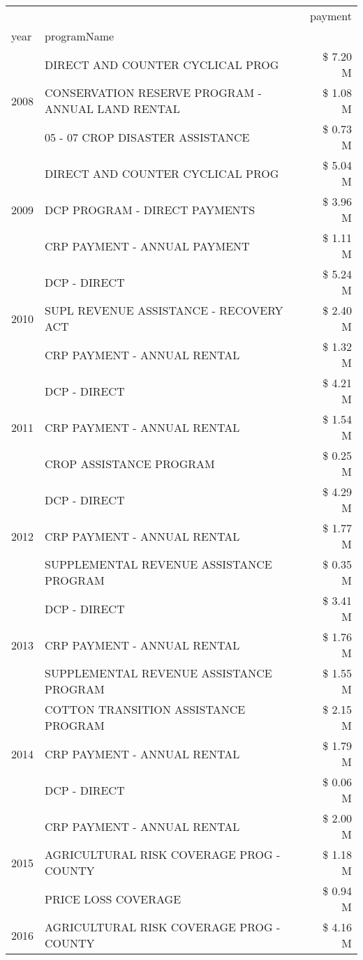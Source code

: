 \begin{tabular}{llr}
\toprule
 &  & payment \\
year & programName &  \\
\midrule
\multirow[t]{3}{*}{2008} & DIRECT AND COUNTER CYCLICAL PROG & \$ 7.20 M \\
 & CONSERVATION RESERVE PROGRAM - ANNUAL LAND RENTAL & \$ 1.08 M \\
 & 05 - 07 CROP DISASTER ASSISTANCE & \$ 0.73 M \\
\cline{1-3}
\multirow[t]{3}{*}{2009} & DIRECT AND COUNTER CYCLICAL PROG & \$ 5.04 M \\
 & DCP PROGRAM - DIRECT PAYMENTS & \$ 3.96 M \\
 & CRP PAYMENT - ANNUAL PAYMENT & \$ 1.11 M \\
\cline{1-3}
\multirow[t]{3}{*}{2010} & DCP - DIRECT & \$ 5.24 M \\
 & SUPL REVENUE ASSISTANCE - RECOVERY ACT & \$ 2.40 M \\
 & CRP PAYMENT - ANNUAL RENTAL & \$ 1.32 M \\
\cline{1-3}
\multirow[t]{3}{*}{2011} & DCP - DIRECT & \$ 4.21 M \\
 & CRP PAYMENT - ANNUAL RENTAL & \$ 1.54 M \\
 & CROP ASSISTANCE PROGRAM & \$ 0.25 M \\
\cline{1-3}
\multirow[t]{3}{*}{2012} & DCP - DIRECT & \$ 4.29 M \\
 & CRP PAYMENT - ANNUAL RENTAL & \$ 1.77 M \\
 & SUPPLEMENTAL REVENUE ASSISTANCE PROGRAM & \$ 0.35 M \\
\cline{1-3}
\multirow[t]{3}{*}{2013} & DCP - DIRECT & \$ 3.41 M \\
 & CRP PAYMENT - ANNUAL RENTAL & \$ 1.76 M \\
 & SUPPLEMENTAL REVENUE ASSISTANCE PROGRAM & \$ 1.55 M \\
\cline{1-3}
\multirow[t]{3}{*}{2014} & COTTON TRANSITION ASSISTANCE PROGRAM & \$ 2.15 M \\
 & CRP PAYMENT - ANNUAL RENTAL & \$ 1.79 M \\
 & DCP - DIRECT & \$ 0.06 M \\
\cline{1-3}
\multirow[t]{3}{*}{2015} & CRP PAYMENT - ANNUAL RENTAL & \$ 2.00 M \\
 & AGRICULTURAL RISK COVERAGE PROG - COUNTY & \$ 1.18 M \\
 & PRICE LOSS COVERAGE & \$ 0.94 M \\
\cline{1-3}
\multirow[t]{3}{*}{2016} & AGRICULTURAL RISK COVERAGE PROG - COUNTY & \$ 4.16 M \\

\end{tabular}
